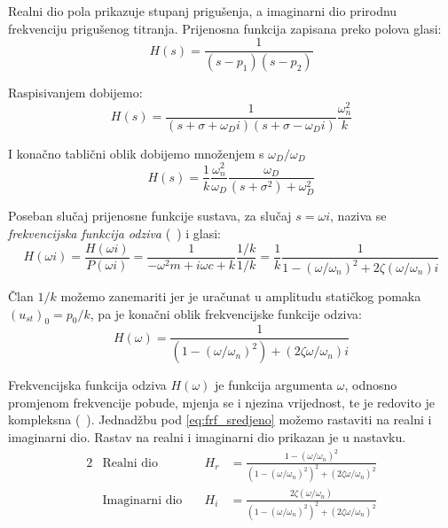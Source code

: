 Realni dio pola prikazuje stupanj prigušenja, a imaginarni dio prirodnu frekvenciju 
prigušenog titranja. Prijenosna funkcija zapisana preko polova glasi:
\begin{equation}
    H(s)=\frac{1}{(s-p_1)(s-p_2)}
\end{equation}

Raspisivanjem dobijemo:
\begin{equation}
    H(s)=\frac{1}{(s+\sigma+\omega_Di)(s+\sigma-\omega_Di)}\frac{\omega_n^2}{k}
\end{equation}

I konačno tablični oblik dobijemo množenjem s $\omega_D/\omega_D$
\begin{equation}
    H(s)=\frac{1}{k}\frac{\omega_n^2}{\omega_D}\frac{\omega_D}{(s+\sigma^2)+\omega_D^2}
\end{equation}

Poseban slučaj prijenosne funkcije sustava, za slučaj $s=\omega i$, naziva se
\textit{frekvencijska funkcija odziva} (~\cite{sisbabic}) i glasi:
\begin{equation} \label{eq:frf_nesredjeno}
    H(\omega i) = \frac{H(\omega i)}{P(\omega i)}
                = \frac{1}{-\omega^2 m + i\omega c + k}\frac{1/k}{1/k}
                = \frac{1}{k}\frac{1}{1-(\omega/\omega_n)^2+2\zeta(\omega/\omega_n)i}
\end{equation}

Član $1/k$ možemo zanemariti jer je uračunat u amplitudu statičkog pomaka $(u_{st})_0=p_0/k$,
pa je konačni oblik frekvencijske funkcije odziva:
\begin{equation}\label{eq:frf_sredjeno}
    H(\omega) = \frac{1}{\left(1-(\omega/\omega_n)^2\right)+\left(2\zeta\omega/\omega_n\right)i}
\end{equation}

Frekvencijska funkcija odziva $H(\omega)$ je funkcija argumenta $\omega$, odnosno promjenom
frekvencije pobude, mjenja se i njezina vrijednost, te je redovito je kompleksna (~\cite{sisbabic}).
Jednadžbu pod \eqref{eq:frf_sredjeno} možemo rastaviti na realni i imaginarni dio.
Rastav na realni i imaginarni dio prikazan je u nastavku.
\begin{alignat}{2}
    &\text{Realni dio} & H_r &= \frac{1-(\omega/\omega_n)^2}{(1-(\omega/\omega_n)^2)^2+(2\zeta\omega/\omega_n)^2}
        \label{eq:realni_dio_frf}\\
    &\text{Imaginarni dio}\quad & H_i &=\frac{2\zeta(\omega/\omega_n)}{(1-(\omega/\omega_n)^2)^2+(2\zeta\omega/\omega_n)^2}
        \label{eq:imaginarni_dio_frf}
\end{alignat}

